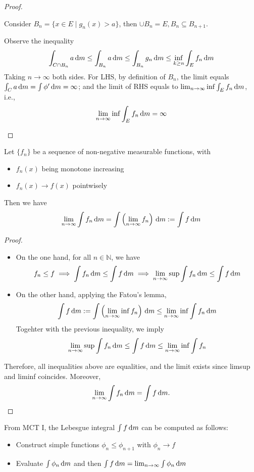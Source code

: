 \begin{proof}
\begin{enumerate}
\begin{enumerate}
Consider $B_n=\{x\in E\mid g_n(x)>a\}$, then $\cup B_n=E, B_n\subseteq B_{n+1}$.

Observe the inequality
\[
\int_{C\cap B_n}a\,\mathrm{d} m\le \int_{B_n}a\,\mathrm{d} m\le \int_{B_n}g_n\,\mathrm{d} m\le \inf_{k\ge n}\int_Ef_n\,\mathrm{d} m
\]
Taking $n\to\infty$ both sides. For LHS, by definition of $B_n$, the limit equals $\int_Ca\,\mathrm{d} m = \int\phi'\,\mathrm{d} m=\infty$;
and the limit of RHS equals to $\lim_{n\to\infty}\inf\int_Ef_n\,\mathrm{d} m$, i.e.,
\[
\lim_{n\to\infty}\inf\int_Ef_n\,\mathrm{d} m=\infty
\]
\end{enumerate}

\end{enumerate}

\end{proof}

\begin{theorem}
Let $\{f_n\}$ be a sequence of non-negative measurable functions, with 
\begin{itemize}
\item
$f_n(x)$ being monotone increasing
\item
$f_n(x)\to f(x)$ pointwisely
\end{itemize}
Then we have
\[
\lim_{n\to\infty}\int f_n\,\mathrm{d} m = \int\left(\lim_{n\to\infty}f_n\right)\,\mathrm{d} m:=\int f\,\mathrm{d} m
\]
\end{theorem}
\begin{proof}
\begin{itemize}
\item
On the one hand, for all $n\in\mathbb{N}$, we have
\[
f_n\le f\implies \int f_n\,\mathrm{d} m\le\int f\,\mathrm{d} m\implies
\lim_{n\to\infty}\sup \int f_n\,\mathrm{d} m\le \int f\,\mathrm{d} m
\]
\item
On the other hand, applying the Fatou's lemma,
\[
\int f\,\mathrm{d} m:=
\int\left(\lim_{n\to\infty}\inf f_n\right)\,\mathrm{d} m\le \lim_{n\to\infty}\inf \int f_n\,\mathrm{d} m
\]
Togehter with the previous inequality, we imply
\[
\lim_{n\to\infty}\sup \int f_n\,\mathrm{d} m\le \int f\,\mathrm{d} m
\le
 \lim_{n\to\infty}\inf \int f_n
\]
\end{itemize}
Therefore, all inequalities above are equalities, and the limit exists since limsup and liminf coincides. Moreover,
\[
\lim_{n\to\infty}\int f_n\,\mathrm{d} m=
 \int f\,\mathrm{d} m.
\]
\end{proof}

From MCT I, the Lebesgue integral $\int f\,\mathrm{d} m$ can be computed as follows:
\begin{itemize}
\item
Construct simple functions $\phi_n\le\phi_{n+1}$ with $\phi_n\to f$
\item
Evaluate $\int\phi_n\,\mathrm{d} m$ and then $\int f\,\mathrm{d} m = \lim_{n\to\infty}\int\phi_n\,\mathrm{d} m$
\end{itemize}




